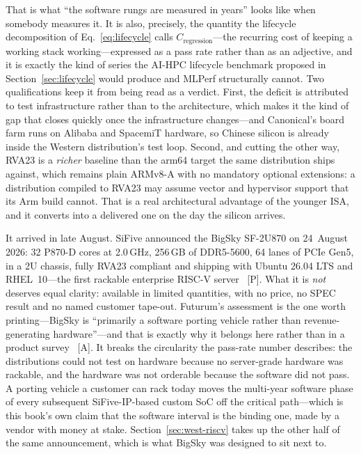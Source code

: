 That is what ``the software rungs are measured in years'' looks like when somebody measures it. It is also, precisely, the quantity the lifecycle decomposition of Eq.~\eqref{eq:lifecycle} calls $C_{\mathrm{regression}}$---the recurring cost of keeping a working stack working---expressed as a pass rate rather than as an adjective, and it is exactly the kind of series the AI-HPC lifecycle benchmark proposed in Section~\ref{sec:lifecycle} would produce and MLPerf structurally cannot. Two qualifications keep it from being read as a verdict. First, the deficit is attributed to test infrastructure rather than to the architecture, which makes it the kind of gap that closes quickly once the infrastructure changes---and Canonical's board farm runs on Alibaba and SpacemiT hardware, so Chinese silicon is already inside the Western distribution's test loop. Second, and cutting the other way, RVA23 is a \emph{richer} baseline than the arm64 target the same distribution ships against, which remains plain ARMv8-A with no mandatory optional extensions: a distribution compiled to RVA23 may assume vector and hypervisor support that its Arm build cannot. That is a real architectural advantage of the younger ISA, and it converts into a delivered one on the day the silicon arrives.

It arrived in late August. SiFive announced the BigSky SF-2U870 on 24~August 2026: 32 P870-D cores at 2.0\,GHz, 256\,GB of DDR5-5600, 64 lanes of PCIe Gen5, in a 2U chassis, fully RVA23 compliant and shipping with Ubuntu 26.04 LTS and RHEL~10---the first rackable enterprise RISC-V server~\cite{sifive-bigsky} [P]. What it is \emph{not} deserves equal clarity: available in limited quantities, with no price, no SPEC result and no named customer tape-out. Futurum's assessment is the one worth printing---BigSky is ``primarily a software porting vehicle rather than revenue-generating hardware''---and that is exactly why it belongs here rather than in a product survey~\cite{sifive-bigsky} [A]. It breaks the circularity the pass-rate number describes: the distributions could not test on hardware because no server-grade hardware was rackable, and the hardware was not orderable because the software did not pass. A porting vehicle a customer can rack today moves the multi-year software phase of every subsequent SiFive-IP-based custom SoC off the critical path---which is this book's own claim that the software interval is the binding one, made by a vendor with money at stake. Section~\ref{sec:west-riscv} takes up the other half of the same announcement, which is what BigSky was designed to sit next to.

